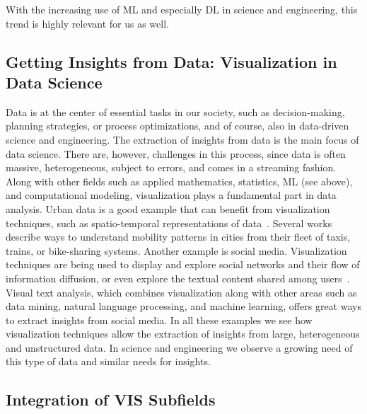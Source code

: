 \documentclass[10pt,journal,compsoc]{IEEEtran}
\begin{document}
{With the increasing use of ML and especially DL in science and engineering, this trend is highly relevant for us as well.


\subsection{Getting Insights from Data: Visualization in Data Science}

Data is at the center of essential tasks in our society, such as decision-making, planning strategies, or process optimizations, and of course, also in data-driven science and engineering. The extraction of insights from data is the main focus of data science. There are, however, challenges in this process, since data is often massive, heterogeneous, subject to errors, and comes in a streaming fashion. Along with other fields such as applied mathematics, statistics, ML (see above), and computational modeling, visualization plays a fundamental part in data analysis. Urban data is a good example that can benefit from visualization techniques, such as spatio-temporal representations of data~\cite{Doraiswamy2018}. Several works describe ways to understand mobility patterns in cities from their fleet of taxis, trains, or bike-sharing systems. 
Another example is social media. Visualization techniques are being used to display and explore social networks and their flow of information diffusion, or even explore the textual content shared among users~\cite{Chen2017}. Visual text analysis, which combines visualization along with other areas such as data mining, natural language processing, and machine learning, offers great ways to extract insights from social media. In all these examples we see how visualization techniques allow the extraction of insights from large, heterogeneous and unstructured data. In science and engineering we observe a growing need of this type of data and similar needs for insights. 


\subsection{Integration of VIS Subfields}

}
\end{document}
